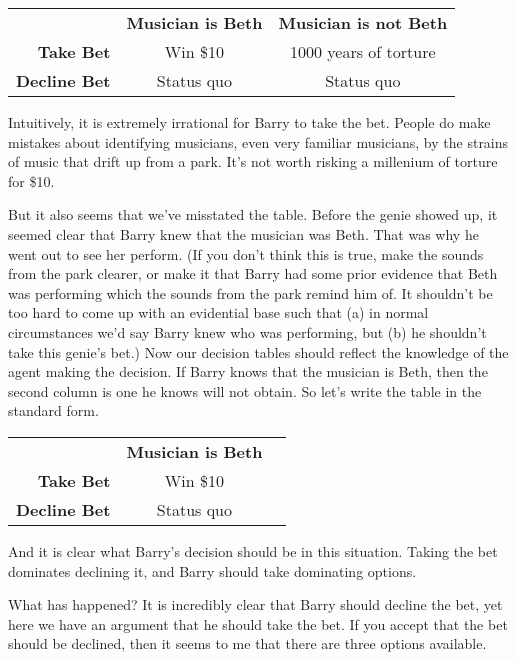 \begin{center}
\begin{tabular}{r c c}
 & \textbf{Musician is Beth} & \textbf{Musician is not Beth} \\
\textbf{Take Bet} & Win \$10 & 1000 years of torture \\
\textbf{Decline Bet} & Status quo & Status quo \\
\end{tabular}
\end{center}

\noindent Intuitively, it is extremely irrational for Barry to take the bet. People do make mistakes about identifying musicians, even very familiar musicians, by the strains of music that drift up from a park. It's not worth risking a millenium of torture for \$10.

But it also seems that we've misstated the table. Before the genie showed up, it seemed clear that Barry knew that the musician was Beth. That was why he went out to see her perform. (If you don't think this is true, make the sounds from the park clearer, or make it that Barry had some prior evidence that Beth was performing which the sounds from the park remind him of. It shouldn't be too hard to come up with an evidential base such that (a) in normal circumstances we'd say Barry knew who was performing, but (b) he shouldn't take this genie's bet.) Now our decision tables should reflect the knowledge of the agent making the decision. If Barry knows that the musician is Beth, then the second column is one he knows will not obtain. So let's write the table in the standard form.

\begin{center}
\begin{tabular}{r c c}
 & \textbf{Musician is Beth} &  \\
\textbf{Take Bet} & Win \$10  \\
\textbf{Decline Bet} & Status quo &  \\
\end{tabular}
\end{center}

\noindent And it is clear what Barry's decision should be in this situation. Taking the bet dominates declining it, and Barry should take dominating options.

What has happened? It is incredibly clear that Barry should decline the bet, yet here we have an argument that he should take the bet. If you accept that the bet should be declined, then it seems to me that there are three options available.

